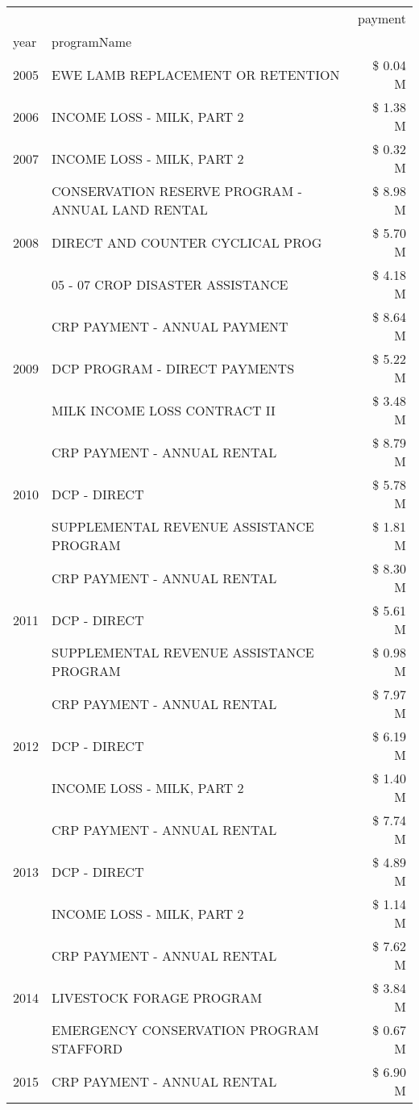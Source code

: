 \begin{tabular}{llr}
\toprule
 &  & payment \\
year & programName &  \\
\midrule
2005 & EWE LAMB REPLACEMENT OR RETENTION & \$ 0.04 M \\
\cline{1-3}
2006 & INCOME LOSS - MILK, PART 2 & \$ 1.38 M \\
\cline{1-3}
2007 & INCOME LOSS - MILK, PART 2 & \$ 0.32 M \\
\cline{1-3}
\multirow[t]{3}{*}{2008} & CONSERVATION RESERVE PROGRAM - ANNUAL LAND RENTAL & \$ 8.98 M \\
 & DIRECT AND COUNTER CYCLICAL PROG & \$ 5.70 M \\
 & 05 - 07 CROP DISASTER ASSISTANCE & \$ 4.18 M \\
\cline{1-3}
\multirow[t]{3}{*}{2009} & CRP PAYMENT - ANNUAL PAYMENT & \$ 8.64 M \\
 & DCP PROGRAM - DIRECT PAYMENTS & \$ 5.22 M \\
 & MILK INCOME LOSS CONTRACT II & \$ 3.48 M \\
\cline{1-3}
\multirow[t]{3}{*}{2010} & CRP PAYMENT - ANNUAL RENTAL & \$ 8.79 M \\
 & DCP - DIRECT & \$ 5.78 M \\
 & SUPPLEMENTAL REVENUE ASSISTANCE PROGRAM & \$ 1.81 M \\
\cline{1-3}
\multirow[t]{3}{*}{2011} & CRP PAYMENT - ANNUAL RENTAL & \$ 8.30 M \\
 & DCP - DIRECT & \$ 5.61 M \\
 & SUPPLEMENTAL REVENUE ASSISTANCE PROGRAM & \$ 0.98 M \\
\cline{1-3}
\multirow[t]{3}{*}{2012} & CRP PAYMENT - ANNUAL RENTAL & \$ 7.97 M \\
 & DCP - DIRECT & \$ 6.19 M \\
 & INCOME LOSS - MILK, PART 2 & \$ 1.40 M \\
\cline{1-3}
\multirow[t]{3}{*}{2013} & CRP PAYMENT - ANNUAL RENTAL & \$ 7.74 M \\
 & DCP - DIRECT & \$ 4.89 M \\
 & INCOME LOSS - MILK, PART 2 & \$ 1.14 M \\
\cline{1-3}
\multirow[t]{3}{*}{2014} & CRP PAYMENT - ANNUAL RENTAL & \$ 7.62 M \\
 & LIVESTOCK FORAGE PROGRAM & \$ 3.84 M \\
 & EMERGENCY CONSERVATION PROGRAM STAFFORD & \$ 0.67 M \\
\cline{1-3}
\multirow[t]{3}{*}{2015} & CRP PAYMENT - ANNUAL RENTAL & \$ 6.90 M \\

\end{tabular}
